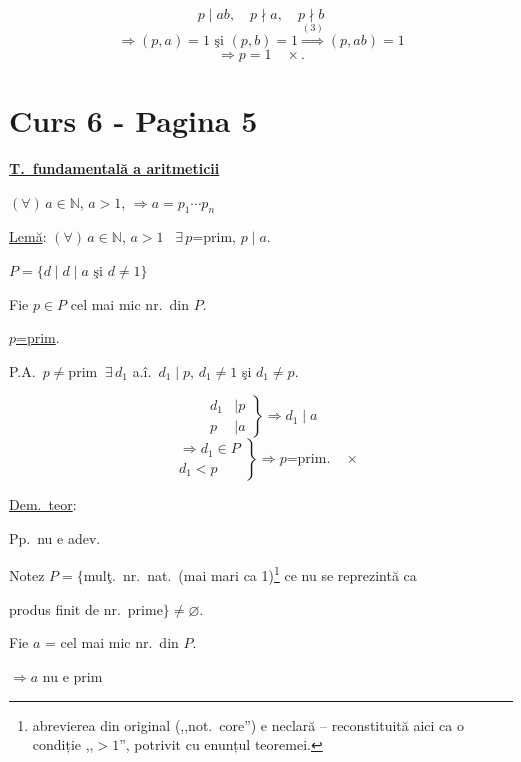 \[
p\mid ab,\quad p\nmid a,\quad p\nmid b
\]
\[
\Rightarrow (p,a)=1 \text{ şi } (p,b)=1 \overset{(3)}{\Longrightarrow} (p,ab)=1
\]
\[
\Rightarrow p=1 \quad \times.
\]





\section*{Curs 6 - Pagina 5}

\noindent\underline{\textbf{T.\ fundamentală a aritmeticii}}

\bigskip
\noindent $(\forall)\,a\in\mathbb{N}$, $a>1$, $\Rightarrow a=p_1\cdots p_n$


\bigskip
\noindent\underline{Lemă}: $(\forall)\,a\in\mathbb{N}$, $a>1$ \ $\exists\,p$=prim, $p\mid a$.

\bigskip
\noindent $P=\{d \mid d\mid a \text{ şi } d\neq 1\}$

\bigskip
\noindent Fie $p\in P$ cel mai mic nr.\ din $P$.

\noindent\underline{$p$=prim}.

\bigskip
\noindent P.A.\ $p\neq$prim $\ \exists\,d_1$ a.î.\ $d_1\mid p$, $d_1\neq 1$ şi $d_1\neq p$.

\[
\left.\begin{aligned} d_1&\mid p\\ p&\mid a\end{aligned}\right\} \Rightarrow d_1\mid a
\]
\[
\left.\begin{aligned} &\Rightarrow d_1\in P\\ &d_1<p\end{aligned}\right\} \Rightarrow p\text{=prim.} \quad \times
\]

\bigskip
\noindent\underline{Dem.\ teor}:

\noindent Pp.\ nu e adev.

\noindent Notez $P=\big\{$mulţ.\ nr.\ nat.\ (mai mari ca 1)\footnote{abrevierea din original (,,not.\ core'') e neclară -- reconstituită aici ca o condiție ,,$>1$'', potrivit cu enunțul teoremei.} ce nu se reprezintă ca

\noindent produs finit de nr.\ prime$\big\} \neq \varnothing$.

\bigskip
\noindent Fie $a$ = cel mai mic nr.\ din $P$.

\noindent $\Rightarrow a$ nu e prim

